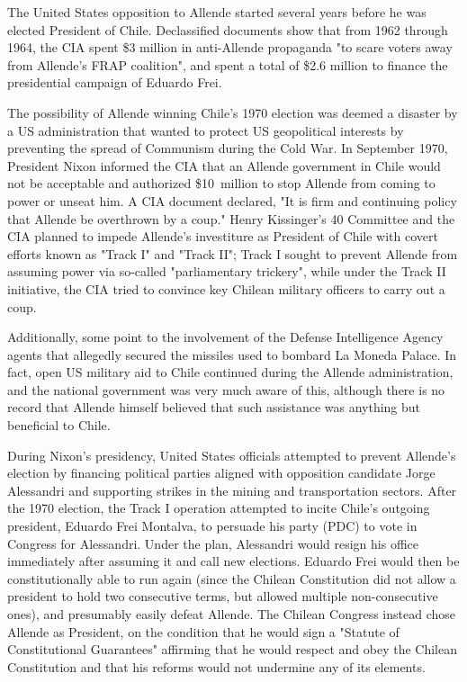 The United States opposition to Allende started several years before he
was elected President of Chile. Declassified documents show that from
1962 through 1964, the CIA spent \$3 million in anti-Allende propaganda
"to scare voters away from Allende's FRAP coalition", and spent a total
of \$2.6 million to finance the presidential campaign of Eduardo Frei.

The possibility of Allende winning Chile's 1970 election was deemed a
disaster by a US administration that wanted to protect US geopolitical
interests by preventing the spread of Communism during the Cold War. In
September 1970, President Nixon informed the CIA that an Allende
government in Chile would not be acceptable and authorized \$10~million
to stop Allende from coming to power or unseat him. A CIA document
declared, "It is firm and continuing policy that Allende be overthrown
by a coup." Henry Kissinger's 40 Committee and the CIA planned to impede
Allende's investiture as President of Chile with covert efforts known as
"Track I" and "Track II"; Track I sought to prevent Allende from
assuming power via so-called "parliamentary trickery", while under the
Track II initiative, the CIA tried to convince key Chilean military
officers to carry out a coup.

Additionally, some point to the involvement of the Defense Intelligence
Agency agents that allegedly secured the missiles used to bombard La
Moneda Palace. In fact, open US military aid to Chile continued during
the Allende administration, and the national government was very much
aware of this, although there is no record that Allende himself believed
that such assistance was anything but beneficial to Chile.

During Nixon's presidency, United States officials attempted to prevent
Allende's election by financing political parties aligned with
opposition candidate Jorge Alessandri and supporting strikes in the
mining and transportation sectors. After the 1970 election, the Track I
operation attempted to incite Chile's outgoing president, Eduardo Frei
Montalva, to persuade his party (PDC) to vote in Congress for
Alessandri. Under the plan, Alessandri would resign his office
immediately after assuming it and call new elections. Eduardo Frei would
then be constitutionally able to run again (since the Chilean
Constitution did not allow a president to hold two consecutive terms,
but allowed multiple non-consecutive ones), and presumably easily defeat
Allende. The Chilean Congress instead chose Allende as President, on the
condition that he would sign a "Statute of Constitutional Guarantees"
affirming that he would respect and obey the Chilean Constitution and
that his reforms would not undermine any of its elements.


